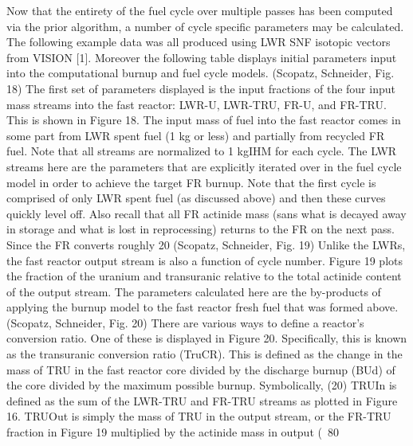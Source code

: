 Now that the entirety of the fuel cycle over multiple passes has been computed via the prior algorithm, a number of cycle specific parameters may be calculated.  The following example data was all produced using LWR SNF isotopic vectors from VISION [1]. Moreover the following table displays initial parameters input into the computational burnup and fuel cycle models.
(Scopatz, Schneider, Fig. 18)
The first set of parameters displayed is the input fractions of the four input mass streams into the fast reactor: LWR-U, LWR-TRU, FR-U, and FR-TRU.  This is shown in Figure 18.  The input mass of fuel into the fast reactor comes in some part from LWR spent fuel (1 kg or less) and partially from recycled FR fuel.  Note that all streams are normalized to 1 kgIHM for each cycle.  The LWR streams here are the parameters that are explicitly iterated over in the fuel cycle model in order to achieve the target FR burnup.  Note that the first cycle is comprised of only LWR spent fuel (as discussed above) and then these curves quickly level off.    Also recall that all FR actinide mass (sans what is decayed away in storage and what is lost in reprocessing) returns to the FR on the next pass.  Since the FR converts roughly 20%
(Scopatz, Schneider, Fig. 19)
Unlike the LWRs, the fast reactor output stream is also a function of cycle number.  Figure 19 plots the fraction of the uranium and transuranic relative to the total actinide content of the output stream.   The parameters calculated here are the by-products of applying the burnup model to the fast reactor fresh fuel that was formed above.
(Scopatz, Schneider, Fig. 20)
There are various ways to define a reactor’s conversion ratio.  One of these is displayed in Figure 20.  Specifically, this is known as the transuranic conversion ratio (TruCR).  This is defined as the change in the mass of TRU in the fast reactor core divided by the discharge burnup (BUd) of the core divided by the maximum possible burnup.  Symbolically, 
                        (20)
TRUIn is defined as the sum of the LWR-TRU and FR-TRU streams as plotted in Figure 16.  TRUOut is simply the mass of TRU in the output stream, or the FR-TRU fraction in Figure 19 multiplied by the actinide mass in output (~80%
